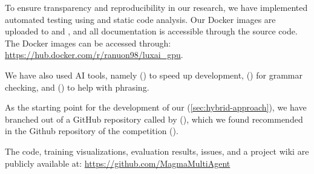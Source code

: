 \bigskip

\noindent To ensure transparency and reproducibility in our research, we have implemented automated testing using  and static code analysis. Our Docker images are uploaded to  and , and all documentation is accessible through the source code. The Docker images can be accessed through: \url{https://hub.docker.com/r/ranuon98/luxai_gpu}.

\bigskip

\noindent We have also used AI tools, namely  (\textcolor{deepblue}{\cite{github-copilot}}) to speed up development,  (\textcolor{deepblue}{\cite{Grammarly}}) for grammar checking, and  (\textcolor{deepblue}{\cite{chatgpt}}) to help with phrasing.

\bigskip

\noindent As the starting point for the development of our  (\autoref{sec:hybrid-approach}), we have branched out of a GitHub repository called  by  (\cite{luxai_s2-baseline-source}), which we found recommended in the Github repository of the  competition (\cite{luxais2_neurips_23}).

\bigskip

\noindent The code, training visualizations, evaluation results, issues, and a project wiki are publicly available at: \url{https://github.com/MagmaMultiAgent}
